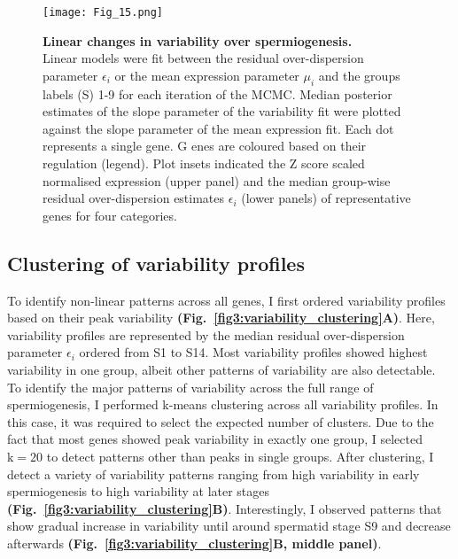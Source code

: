 \newpage

\begin{figure}[!h]
\centering
\texttt{[image: Fig\_15.png]}
\caption[Linear changes in variability over spermiogenesis]{\textbf{Linear changes in variability over spermiogenesis.}\\
Linear models were fit between the residual over-dispersion parameter $\epsilon_i$ or the mean expression parameter $\mu_i$ and the groups labels (S) 1-9 for each iteration of the MCMC. 
Median posterior estimates of the slope parameter of the variability fit were plotted against the slope parameter of the mean expression fit. 
Each dot represents a single gene. G
enes are coloured based on their regulation (legend). 
Plot insets indicated the Z score scaled normalised expression (upper panel) and the median group-wise residual over-dispersion estimates $\epsilon_i$ (lower panels) of representative genes for four categories.}
\label{fig3:linear_variability}
\end{figure}

\newpage

\subsection{Clustering of variability profiles}

To identify non-linear patterns across all genes, I first ordered variability profiles based on their peak variability \textbf{(Fig.~\ref{fig3:variability_clustering}A)}. 
Here, variability profiles are represented by the median residual over-dispersion parameter $\epsilon_i$  ordered from S1 to S14. 
Most variability profiles showed highest variability in one group, albeit other patterns of variability are also detectable. \\

To identify the major patterns of variability across the full range of spermiogenesis, I performed k-means clustering across all variability profiles. 
In this case, it was required to select the expected number of clusters. 
Due to the fact that most genes showed peak variability in exactly one group, I selected $\text{k}=20$ to detect patterns other than peaks in single groups. 
After clustering, I detect a variety of variability patterns ranging from high variability in early spermiogenesis to high variability at later stages \textbf{(Fig.~\ref{fig3:variability_clustering}B)}. 
Interestingly, I observed patterns that show gradual increase in variability until around spermatid stage S9 and decrease afterwards \textbf{(Fig.~\ref{fig3:variability_clustering}B, middle panel)}. \\

